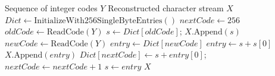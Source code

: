 \documentclass[12pt,a4paper]{article}
\begin{document}
\begin{algorithm}[H]
\caption{LZW Decompression}
\begin{algorithmic}[1]
\Require Sequence of integer codes $Y$
\Ensure Reconstructed character stream $X$
\State $Dict \gets \text{InitializeWith256SingleByteEntries}()$
\State $nextCode \gets 256$
\State $oldCode \gets \text{ReadCode}(Y)$
\State $s \gets Dict[oldCode]$; $X.\text{Append}(s)$
    \State $newCode \gets \text{ReadCode}(Y)$
        \State $entry \gets Dict[newCode]$
    \Else {}
        \State $entry \gets s + s[0]$
    \EndIf
    \State $X.\text{Append}(entry)$
        \State $Dict[nextCode] \gets s + entry[0]$; $nextCode \gets nextCode + 1$
    \EndIf
    \State $s \gets entry$
\EndWhile
\State \Return $X$
\end{algorithmic}
\end{algorithm}
\end{document}
